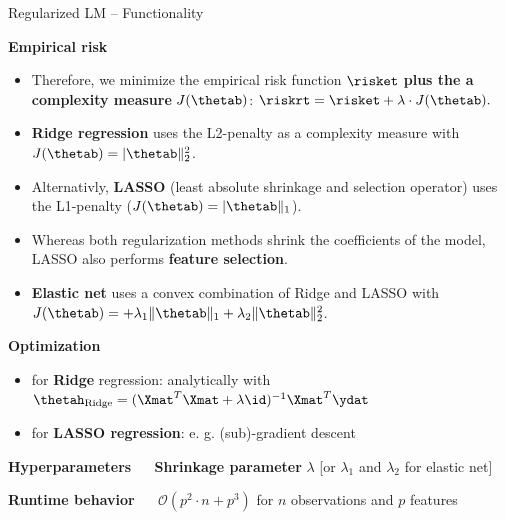 \documentclass[11pt,compress,t,notes=noshow, xcolor=table]{beamer}
\newcommand{\highlight}[1]{\textcolor{highlightcol}{\textbf{#1}}}
\begin{document}

\begin{frame}{Regularized LM -- Functionality}

\footnotesize

\highlight{Empirical risk}

\begin{itemize}

\item Therefore, we minimize the empirical risk function $\risket$ \textbf{plus the a complexity measure} $J(\thetab)$:
  $
  \riskrt = \risket + \lambda \cdot J(\thetab). 
  $ 
  
\item \textbf{Ridge regression} uses the L2-penalty as a complexity measure with $J(\thetab) = |\thetab\|_2^2 $. 

\item Alternativly, \textbf{LASSO} (least absolute shrinkage and selection operator) uses the L1-penalty ($J(\thetab) = |\thetab\|_1 $).

\item Whereas both regularization methods shrink the coefficients of the model, LASSO also performs \textbf{feature selection}. 

\item \textbf{Elastic net} uses a convex combination of Ridge and LASSO with $J(\thetab) = + \lambda_1 \|\thetab\|_1 + \lambda_2 \|\thetab\|_2^2$.
  
  
\end{itemize}





\medskip

\highlight{Optimization} ~~
\begin{itemize}\footnotesize
  \item for \textbf{Ridge} regression: analytically with $\thetah_{\text{Ridge}} = (\Xmat^T \Xmat  + \lambda \id)^{-1} \Xmat^T\ydat$
  \item for \textbf{LASSO regression}: e. g. (sub)-gradient descent
\end{itemize}

\medskip

\highlight{Hyperparameters} ~~ \textbf{Shrinkage parameter} $\lambda$ [or $\lambda_1$ and $\lambda_2$ for elastic net] \\

\medskip

\highlight{Runtime behavior} ~~ $\mathcal{O}(p^2 \cdot n + p^3)$ for $n$ 
observations and $p$ features 

\end{frame}
\end{document}
